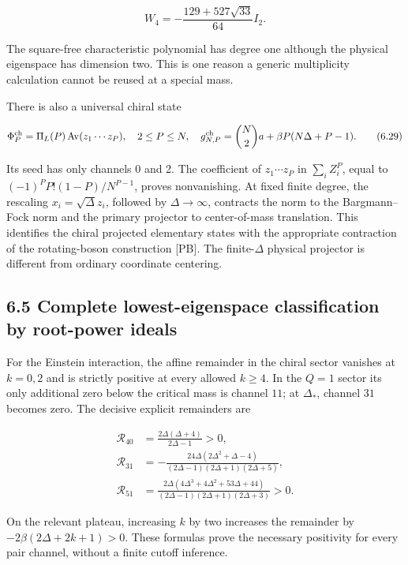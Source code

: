\documentclass[a4paper,11pt]{article}
\numberwithin{equation}{section}
\begin{document}
\[
W_4=-\frac{129+527\sqrt{33}}{64}I_2.
\tag{6.28}
\]

The square-free characteristic polynomial has degree one although the physical eigenspace has dimension two. This is one reason a generic multiplicity calculation cannot be reused at a special mass.

There is also a universal chiral state

\[
\Phi_P^{\rm ch}=\Pi_L(P)\operatorname{Av}(z_1\cdots z_P),
\quad 2\le P\le N,
\quad
g_{N,P}^{\rm ch}=\binom N2a+\beta P(N\Delta+P-1).
\tag{6.29}
\]

Its seed has only channels 0 and 2. The coefficient of \(z_1\cdots z_P\) in \(\sum_iZ_i^P\), equal to \((-1)^PP!(1-P)/N^{P-1}\), proves nonvanishing. At fixed finite degree, the rescaling \(x_i=\sqrt\Delta z_i\), followed by \(\Delta\to\infty\), contracts the norm to the Bargmann--Fock norm and the primary projector to center-of-mass translation. This identifies the chiral projected elementary states with the appropriate contraction of the rotating-boson construction {[}PB{]}. The finite-\(\Delta\) physical projector is different from ordinary coordinate centering.

\hypertarget{complete-lowest-eigenspace-classification-by-root-power-ideals}{%
\subsection{6.5 Complete lowest-eigenspace classification by root-power ideals}\label{complete-lowest-eigenspace-classification-by-root-power-ideals}}

For the Einstein interaction, the affine remainder in the chiral sector vanishes at \(k=0,2\) and is strictly positive at every allowed \(k\ge4\). In the \(Q=1\) sector its only additional zero below the critical mass is channel \(11\); at \(\Delta_*\), channel \(31\) becomes zero. The decisive explicit remainders are

\[
\begin{aligned}
\mathcal R_{40}&=\frac{2\Delta(\Delta+4)}{2\Delta-1}>0,\\
\mathcal R_{31}&=-\frac{24\Delta(2\Delta^2+\Delta-4)}{(2\Delta-1)(2\Delta+1)(2\Delta+5)},\\
\mathcal R_{51}&=\frac{2\Delta(4\Delta^3+4\Delta^2+53\Delta+44)}
{(2\Delta-1)(2\Delta+1)(2\Delta+3)}>0.
\end{aligned}
\tag{6.30}
\]

On the relevant plateau, increasing \(k\) by two increases the remainder by \(-2\beta(2\Delta+2k+1)>0\). These formulas prove the necessary positivity for every pair channel, without a finite cutoff inference.
\end{document}
